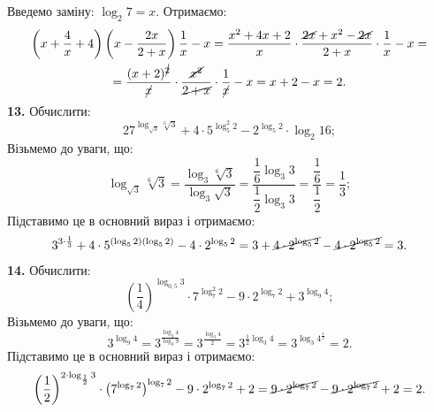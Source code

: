 Введемо заміну: $\log_{2}7=x$. Отримаємо:
\begin{multline*}
\left(x+\dfrac{4}{x}+4\right)\left(x-\dfrac{2x}{2+x}\right)\dfrac{1}{x}-x=
\dfrac{x^2+4x+2}{x}\cdot\dfrac{\cancel{2x}+x^2-\cancel{2x}}{2+x}\cdot\dfrac{1}{x}-x=\\
=\dfrac{(x+2)^{\cancel{2}}}{\cancel{x}}\cdot\dfrac{\cancel{x^2}}{\cancel{2+x}}\cdot\dfrac{1}{\cancel{x}}-x=
x+2-x=2.
\end{multline*}
\textbf{13.} Обчислити:
$$
27^{\log_{\sqrt{3}}\sqrt[6]{3}}+4\cdot5^{\log^{2}_{5}2}-2^{\log_{5}2}\cdot\log_{2}16;
$$
Візьмемо до уваги, що:
$$
\log_{\sqrt{3}}\sqrt[6]{3}=
\dfrac{\log_{3}\sqrt[6]{3}}{\log_{3}\sqrt{3}}=
\dfrac{\dfrac{1}{6}\log_{3}3}{\dfrac{1}{2}\log_{3}3}=
\dfrac{\dfrac{1}{6}}{\dfrac{1}{2}}=\dfrac{1}{3};
$$
Підставимо це в основний вираз і отримаємо:
\begin{multline*}
3^{3\cdot\frac{1}{3}}+4\cdot5^{(\log_{5}2)(\log_{5}2)}-4\cdot2^{\log_{5}2}=
3+\cancel{4\cdot2^{\log_{5}2}}-\cancel{4\cdot2^{\log_{5}2}}=3.
\end{multline*}
\textbf{14.} Обчислити:
$$
\left(\dfrac{1}{4}\right)^{\log_{0,5}3}\cdot7^{\log^{2}_{7}2}-9\cdot2^{\log_{7}2}+3^{\log_{9}4};
$$
Візьмемо до уваги, що:
$$
3^{\log_{9}4}=3^{\frac{\log_{3}4}{\log_{3}9}}=
3^{\frac{\log_{3}4}{2}}=
3^{\frac{1}{2}\log_{3}4}=
3^{\log_{3}4^{\frac{1}{2}}}=2.
$$
Підставимо це в основний вираз і отримаємо:
\begin{multline*}
\left(\dfrac{1}{2}\right)^{2\cdot\log_{\frac{1}{2}}3}\cdot\left(7^{\log_{7}2}\right)^{\log_{7}2}-9\cdot2^{\log_{7}2}+2=
\cancel{9\cdot2^{\log_{7}2}}-\cancel{9\cdot2^{\log_{7}2}}+2=2.
\end{multline*}